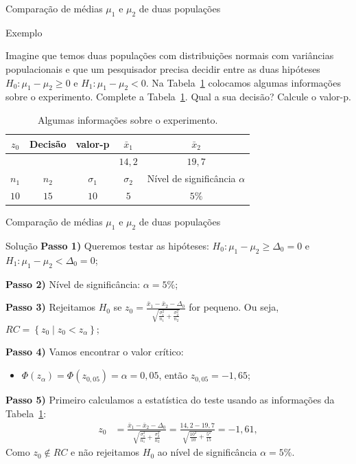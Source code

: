 \documentclass[9pt]{beamer}
\begin{document}
\begin{frame}{Comparação de médias $\mu_1$ e $\mu_2$ de duas populações}

\begin{block}{Exemplo}
	
\end{block}
Imagine que temos duas populações com distribuições normais com variâncias populacionais e que um pesquisador precisa decidir entre as duas hipóteses $H_0: \mu_1 - \mu_2 \geq 0$ e $H_1: \mu_1 - \mu_2 < 0$. Na Tabela~\ref{tab:comparacao-medias} colocamos algumas informações sobre o experimento. Complete a Tabela~\ref{tab:comparacao-medias}. Qual a sua decisão?  Calcule o valor-p.
\begin{table}[htbp]
	\centering
		\begin{tabular}{c|c|c|c|c}
			\toprule[0.05cm]
			$z_0$ & Decisão & valor-p & $\bar{x}_1$ &$\bar{x}_2$\\ \midrule[0.025cm]
			& & & $14,2$ & $19,7$ \\ 
			\midrule[0.05cm]
			$n_1$ & $n_2$ & $\sigma_1$ & $\sigma_2$ & Nível de significância $\alpha$\\ \midrule[0.025cm]
			$10$ & $15$ & $10$ & $5$ & $5\%$\\ \bottomrule[0.05cm]
		\end{tabular}
	\caption{Algumas informações sobre o experimento.}
	\label{tab:comparacao-medias}
\end{table}
\end{frame}

\begin{frame}{Comparação de médias $\mu_1$ e $\mu_2$ de duas populações}

\begin{block}{Solução}
	\textbf{Passo 1)} Queremos testar as hipóteses: $H_0: \mu_1 - \mu_2 \geq \Delta_0 = 0$  e $H_1: \mu_1 - \mu_2 < \Delta_0 = 0$;
	
	\textbf{Passo 2)} Nível de significância: $\alpha=5\%$;
	
	\textbf{Passo 3)} Rejeitamos $H_0$ se $z_0 = \frac{\bar{x}_1 - \bar{x}_2 - \Delta_0}{\sqrt{ \frac{\sigma_1^2}{n_1} + \frac{\sigma_2^2}{n_2} }}$ for pequeno. Ou seja, $RC=\left\{ z_0 \mid z_0 < z_\alpha \right\}$;
	
	\textbf{Passo 4)} Vamos encontrar o valor crítico:
	\begin{itemize}
		\item $\Phi\left( z_\alpha \right) = \Phi\left( z_{0,05} \right) = \alpha = 0,05$, então $z_{0,05} = -1,65$;
	\end{itemize}

	\textbf{Passo 5)} Primeiro calculamos a estatística do teste usando as informações da Tabela~\ref{tab:comparacao-medias}:
	\begin{align*}
		z_0 &= \frac{\bar{x}_1 - \bar{x}_2 - \Delta_0}{\sqrt{ \frac{\sigma_1^2}{n_1} + \frac{\sigma_2^2}{n_2} }} = \frac{ 14,2 - 19,7 }{ \sqrt{ \frac{10^2}{10} + \frac{5^2}{15} } } = -1,61,
	\end{align*}
	Como $z_0 \not\in RC$ e não rejeitamos $H_0$ ao  nível de significância $\alpha=5\%$.
\end{block}

\end{frame}
\end{document}
